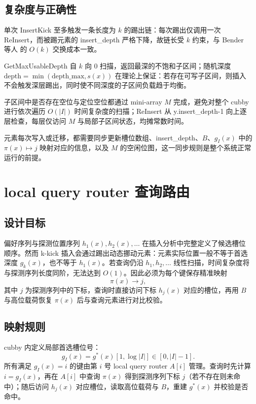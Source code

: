 \subsection{复杂度与正确性}

单次 InsertKick 至多触发一条长度为 \(k\) 的踢出链：每次踢出仅调用一次 ReInsert，而被踢元素的 insert\_depth 严格下降，故链长受 \(k\) 约束，与 Bender 等人\cite{bender2022otsh} 的 \(O(k)\) 交换成本一致。

GetMaxUsableDepth 自 \(k\) 向 0 扫描，返回最深的不饱和子区间；随机深度 \(\mathrm{depth}=\min(\mathrm{depth\_max},s(x))\) 在理论上保证：若存在可写子区间，则插入不会触发深层踢出，同时使不同深度的子区间负载趋于均衡。

子区间中是否存在空位与定位空位都通过 mini-array \(M\) 完成，避免对整个 cubby 进行依次遍历 \(O(|I|)\) 时间复杂度的扫描；ReInsert 从 y.insert\_depth-1 向上逐层检查，每层仅访问 \(M\) 与局部子区间状态，均摊常数时间。

元素每次写入或迁移，都需要同步更新槽位数组、insert\_depth、\(B\)、\(g_I(x)\) 中的 \(\pi(x)\mapsto j\) 映射对应的信息，以及 \(M\) 的空闲位图，这一同步规则是整个系统正常运行的前提。

\section{local query router 查询路由}

\subsection{设计目标}

偏好序列与探测位置序列 \(h_1(x),h_2(x),\ldots\) 在插入分析中完整定义了候选槽位顺序。然而 k-kick 插入会通过踢出动态挪动元素：元素实际位置一般不等于首选深度 \(g_k(x)\)，也不等于 \(h_1(x)\)。若查询仍沿 \(h_1,h_2,\ldots\) 线性扫描，时间复杂度将与探测序列长度同阶，无法达到 \(O(1)\)。因此必须为每个键保存精准映射
\begin{equation}
  \pi(x)\longrightarrow j,
\end{equation}
其中 \(j\) 为探测序列中的下标，查询时直接访问下标 \(h_j(x)\) 对应的槽位，再用 \(B\) 与高位载荷恢复 \(\pi(x)\) 后与查询元素进行对比校验\cite{bender2022otsh,pagh2008retrieval}。

\subsection{映射规则}

cubby 内定义局部首选槽位号：
\begin{equation}
  g_I(x)=g^\ast(x)[1,\log|I|]\in[0,|I|-1].
\end{equation}
所有满足 \(g_I(x)=i\) 的键由第 \(i\) 号 local query router \(A[i]\) 管理。查询时先计算 \(i=g_I(x)\)，再在 \(A[i]\) 中查询 \(\pi(x)\) 得到探测序列下标 \(j\)（若不存在则未命中）；随后访问 \(h_j(x)\) 对应槽位，读取高位载荷与 \(B\)，重建 \(g^\ast(x)\) 并校验是否命中。

